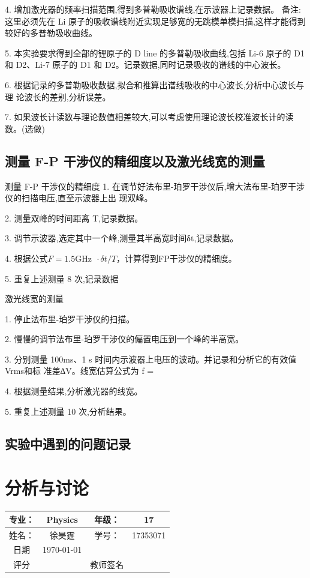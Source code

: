 \documentclass[10pt,a4paper]{ctexart}
\begin{document}
4. 增加激光器的频率扫描范围,得到多普勒吸收谱线,在示波器上记录数据。
备注:这里必须先在 Li 原子的吸收谱线附近实现足够宽的无跳模单模扫描,这样才能得到
较好的多普勒吸收曲线。

5. 本实验要求得到全部的锂原子的 D line 的多普勒吸收曲线,包括 Li-6 原子的 D1 和
D2、Li-7 原子的 D1 和 D2。记录数据,同时记录吸收的谱线的中心波长。

6. 根据记录的多普勒吸收数据,拟合和推算出谱线吸收的中心波长,分析中心波长与理
论波长的差别,分析误差。

7. 如果波长计读数与理论数值相差较大,可以考虑使用理论波长校准波长计的读数。(选做)

\subsection{测量 F-P 干涉仪的精细度以及激光线宽的测量}
测量 F-P 干涉仪的精细度
1.
在调节好法布里-珀罗干涉仪后,增大法布里-珀罗干涉仪的扫描电压,直至示波器上出
现双峰。

2. 测量双峰的时间距离 T,记录数据。

3. 调节示波器,选定其中一个峰,测量其半高宽时间δt,记录数据。

4. 根据公式$F =1.5\mathrm{GHz}\ \ \cdot\delta t/T$，计算得到FP干涉仪的精细度。

5.
重复上述测量 8 次,记录数据

激光线宽的测量

1. 停止法布里-珀罗干涉仪的扫描。

2. 慢慢的调节法布里-珀罗干涉仪的偏置电压到一个峰的半高宽。

3. 分别测量 100ms、1 s 时间内示波器上电压的波动。并记录和分析它的有效值Vrms和标
准差∆V。线宽估算公式为
\beq
\delta f = \times {}
\eeq


4. 根据测量结果,分析激光器的线宽。

5. 重复上述测量 10 次,分析结果。
\subsection{实验中遇到的问题记录}



\newpage
\section{分析与讨论}
\begin{center}
\begin{tabular}{|c|c|c|c|}
	\hline 
	专业：     &Physics       &年级：      & 17     \\
	\hline
	姓名：& 徐昊霆 &学号：&17353071  \\
	\hline
	日期&  \today              & &  \\
	\hline	
	评分 & & 教师签名 & \\
	\hline
\end{tabular}
\end{center}



%
%
\end{document}
